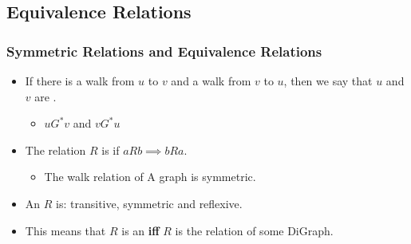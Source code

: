%
%
%
%
%

\subsection{Equivalence Relations}

\begin{frame}
  \frametitle{Symmetric Relations and Equivalence Relations}

  \begin{itemize}
    \item If there is a walk from $u$ to $v$ and a walk from $v$ to
      $u$, then we say that $u$ and $v$ are .
      \begin{itemize}
        \item $uG^*v$ and $vG^*u$
      \end{itemize}\bigskip

    \item The relation $R$ is  if $aRb \implies bRa$.
    \begin{itemize}
      \item The walk relation of A  graph is symmetric.
    \end{itemize}\bigskip

    \item An  $R$ is: transitive,
      symmetric and reflexive.\bigskip

    \item This means that $R$ is an  {\bf iff} $R$ is the  relation of some DiGraph.
    \end{itemize}
\end{frame}


